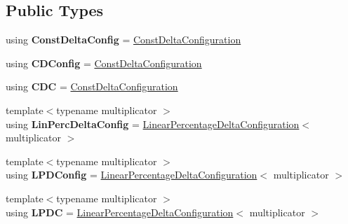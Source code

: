\subsection*{Public Types}
\begin{DoxyCompactItemize}
\item 
\mbox{\label{classanalyzer_1_1_channelling_measurement_interpreter_accc9f8a70dcc765a21094cd0db034f1d}} 
using {\bfseries Const\+Delta\+Config} = \mbox{\hyperlink{classanalyzer_1_1_channelling_measurement_interpreter_1_1_const_delta_configuration}{Const\+Delta\+Configuration}}
\item 
\mbox{\label{classanalyzer_1_1_channelling_measurement_interpreter_a4c96f022700c7eae19a0502436f79c2b}} 
using {\bfseries C\+D\+Config} = \mbox{\hyperlink{classanalyzer_1_1_channelling_measurement_interpreter_1_1_const_delta_configuration}{Const\+Delta\+Configuration}}
\item 
\mbox{\label{classanalyzer_1_1_channelling_measurement_interpreter_a153947caf7428d252dd49116d1988b1a}} 
using {\bfseries C\+DC} = \mbox{\hyperlink{classanalyzer_1_1_channelling_measurement_interpreter_1_1_const_delta_configuration}{Const\+Delta\+Configuration}}
\item 
\mbox{\label{classanalyzer_1_1_channelling_measurement_interpreter_a96e75567888f18eca4d1bb0dca4e0460}} 
{\footnotesize template$<$typename multiplicator $>$ }\\using {\bfseries Lin\+Perc\+Delta\+Config} = \mbox{\hyperlink{classanalyzer_1_1_channelling_measurement_interpreter_1_1_linear_percentage_delta_configuration}{Linear\+Percentage\+Delta\+Configuration}}$<$ multiplicator $>$
\item 
\mbox{\label{classanalyzer_1_1_channelling_measurement_interpreter_a971b511c3615abbb355f9d3ba0165431}} 
{\footnotesize template$<$typename multiplicator $>$ }\\using {\bfseries L\+P\+D\+Config} = \mbox{\hyperlink{classanalyzer_1_1_channelling_measurement_interpreter_1_1_linear_percentage_delta_configuration}{Linear\+Percentage\+Delta\+Configuration}}$<$ multiplicator $>$
\item 
\mbox{\label{classanalyzer_1_1_channelling_measurement_interpreter_ac32b5d513b03824200949e9741cfbb8e}} 
{\footnotesize template$<$typename multiplicator $>$ }\\using {\bfseries L\+P\+DC} = \mbox{\hyperlink{classanalyzer_1_1_channelling_measurement_interpreter_1_1_linear_percentage_delta_configuration}{Linear\+Percentage\+Delta\+Configuration}}$<$ multiplicator $>$
\end{DoxyCompactItemize}
